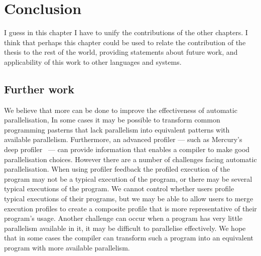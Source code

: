 
\chapter{Conclusion}
\label{chap:conc}


I guess in this chapter I have to unify the contributions of the other
chapters.
I think that perhaps this chapter could be used to relate the contribution
of the thesis to the rest of the world, providing statements about future
work, and applicability of this work to other languages and systems.


\section{Further work}
\label{sec:further_work}





We believe that more can be done to improve the effectiveness of
automatic parallelisation,
In some cases it may be possible to transform common programming
pasterns that lack parallelism into equivalent patterns with available
parallelism.
Furthermore, an advanced profiler --- such as Mercury's deep
profiler~\citep{conway:2001:mercury-deep} --- can provide information
that enables a compiler to make good parallelisation choices.
However there are a number of challenges facing automatic
parallelisation.
When using profiler feedback the profiled execution of the program may
not be a typical execution of the program, or there may be several
typical executions of the program.
We cannot control whether users profile typical executions of their
programs, but we may be able to allow users to merge execution
profiles to create a composite profile that is more representative of
their program's usage.
Another challenge can occur when a program has very little parallelism
available in it, it may be difficult to parallelise effectively.
We hope that in some cases the compiler can transform such a program
into an equivalent program with more available parallelism.

%

